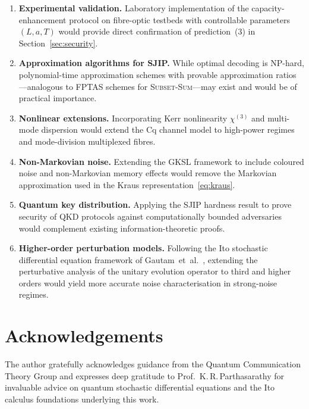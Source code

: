 \documentclass[journal,twocolumn]{IEEEtran}
\theoremstyle{definition}
\theoremstyle{plain}
\begin{document}
\begin{enumerate}[leftmargin=*, label=(\arabic*), itemsep=2pt]
  \item \textbf{Experimental validation.}  Laboratory implementation
    of the capacity-enhancement protocol on fibre-optic testbeds
    with controllable parameters $(L, a, T)$ would provide direct
    confirmation of prediction~(3) in Section~\ref{sec:security}.

  \item \textbf{Approximation algorithms for SJIP.}  While optimal
    decoding is NP-hard, polynomial-time approximation schemes with
    provable approximation ratios---analogous to FPTAS schemes for
    \textsc{Subset-Sum}---may exist and would be of practical
    importance.

  \item \textbf{Nonlinear extensions.}  Incorporating Kerr
    nonlinearity $\chi^{(3)}$ and multi-mode dispersion would
    extend the Cq channel model to high-power regimes and
    mode-division multiplexed fibres.

  \item \textbf{Non-Markovian noise.}  Extending the GKSL framework
    to include coloured noise and non-Markovian memory effects would
    remove the Markovian approximation used in the Kraus
    representation~\eqref{eq:kraus}.

  \item \textbf{Quantum key distribution.}  Applying the
    SJIP hardness result to prove security of QKD protocols against
    computationally bounded adversaries would complement existing
    information-theoretic proofs.

  \item \textbf{Higher-order perturbation models.}  Following
    the Ito stochastic differential equation framework of
    Gautam~et~al.~\cite{gautam2015a}, extending the perturbative
    analysis of the unitary evolution operator to third and higher
    orders would yield more accurate noise characterisation in
    strong-noise regimes.
\end{enumerate}

\section*{Acknowledgements}

The author gratefully acknowledges guidance from the Quantum
Communication Theory Group and expresses deep gratitude to
Prof.~K.\,R.\,Parthasarathy for invaluable advice on quantum
stochastic differential equations and the Ito calculus foundations
underlying this work.
\end{document}
